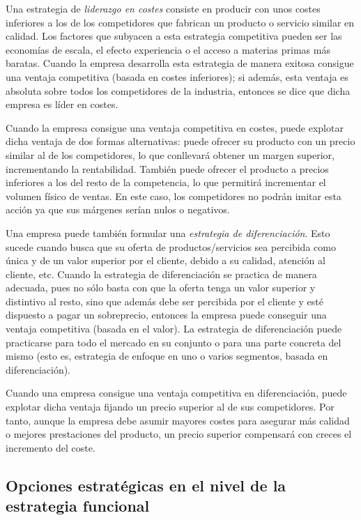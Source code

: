 \documentclass[10pt,a4paper,spanish]{report}
\begin{document}
                  Una estrategia de \textit{\textcolor[rgb]{0.4,0.9,0.6}{liderazgo en costes}} consiste en producir con unos costes inferiores a los de los competidores que fabrican un producto o servicio similar en calidad. Los factores que subyacen a esta estrategia competitiva pueden ser las economías de escala, el efecto experiencia o el acceso a materias primas más baratas. Cuando la empresa desarrolla esta estrategia de manera exitosa consigue una ventaja competitiva (basada en costes inferiores); si además, esta ventaja es absoluta sobre todos los competidores de la industria, entonces se dice que dicha empresa es líder en costes.

                  Cuando la empresa consigue una ventaja competitiva en costes, puede explotar dicha ventaja de dos formas alternativas: puede ofrecer su producto con un precio similar al de los competidores, lo que conllevará obtener un margen superior, incrementando la rentabilidad. También puede ofrecer el producto a precios inferiores a los del resto de la competencia, lo que permitirá incrementar el volumen físico de ventas. En este caso, los competidores no podrán imitar esta acción ya que sus márgenes serían nulos o negativos.

                  Una empresa puede también formular una \textit{\textcolor[rgb]{0.4,0.9,0.6}{estrategia de diferenciación}}. Esto sucede cuando busca que su oferta de productos/servicios sea percibida como única y de un valor superior por el cliente, debido a su calidad, atención al cliente, etc. Cuando la estrategia de diferenciación se practica de manera adecuada, pues no sólo basta con que la oferta tenga un valor superior y distintivo al resto, sino que además debe ser percibida por el cliente y esté dispuesto a pagar un sobreprecio, entonces la empresa puede conseguir una ventaja competitiva (basada en el valor). La estrategia de diferenciación puede practicarse para todo el mercado en su conjunto o para una parte concreta del mismo (esto es, estrategia de enfoque en uno o varios segmentos, basada en diferenciación).

                  Cuando una empresa consigue una ventaja competitiva en diferenciación, puede explotar dicha ventaja fijando un precio superior al de sus competidores. Por tanto, aunque la empresa debe asumir mayores costes para asegurar más calidad o mejores prestaciones del producto, un precio superior compensará con creces el incremento del coste.
            \newpage
            \subsection{\textcolor[rgb]{0.4,0.9,0.6}Opciones estratégicas en el nivel de la estrategia funcional}
\end{document}

